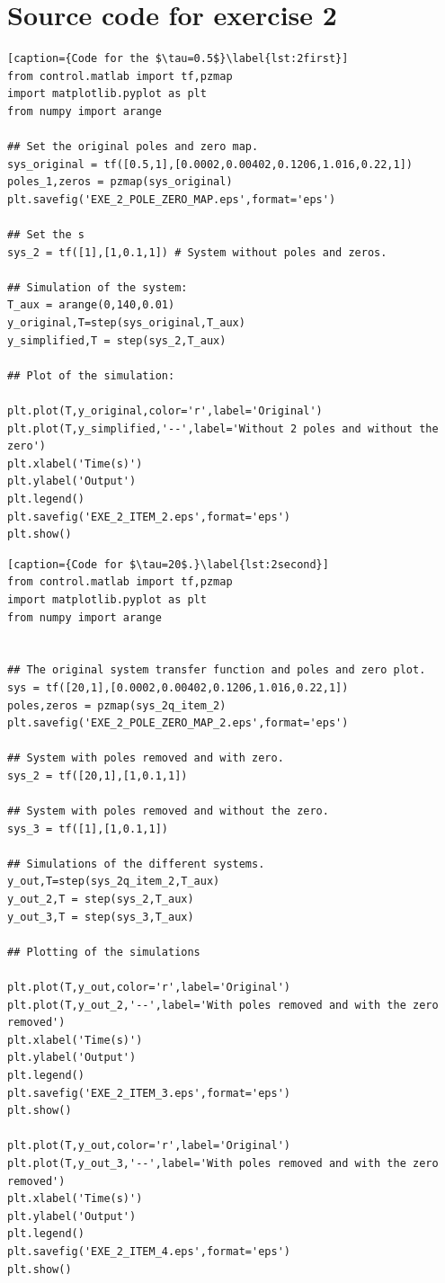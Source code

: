 \documentclass[a4paper]{article}
\begin{document}
\section{Source code for exercise 2}



\begin{lstlisting}[caption={Code for the $\tau=0.5$}\label{lst:2first}]
from control.matlab import tf,pzmap
import matplotlib.pyplot as plt
from numpy import arange

## Set the original poles and zero map.
sys_original = tf([0.5,1],[0.0002,0.00402,0.1206,1.016,0.22,1])
poles_1,zeros = pzmap(sys_original)
plt.savefig('EXE_2_POLE_ZERO_MAP.eps',format='eps')

## Set the s
sys_2 = tf([1],[1,0.1,1]) # System without poles and zeros.

## Simulation of the system:
T_aux = arange(0,140,0.01)
y_original,T=step(sys_original,T_aux)
y_simplified,T = step(sys_2,T_aux)

## Plot of the simulation:

plt.plot(T,y_original,color='r',label='Original')
plt.plot(T,y_simplified,'--',label='Without 2 poles and without the zero')
plt.xlabel('Time(s)')
plt.ylabel('Output')
plt.legend()
plt.savefig('EXE_2_ITEM_2.eps',format='eps')
plt.show()
\end{lstlisting}

\begin{lstlisting}[caption={Code for $\tau=20$.}\label{lst:2second}]
from control.matlab import tf,pzmap
import matplotlib.pyplot as plt
from numpy import arange


## The original system transfer function and poles and zero plot.
sys = tf([20,1],[0.0002,0.00402,0.1206,1.016,0.22,1])
poles,zeros = pzmap(sys_2q_item_2)
plt.savefig('EXE_2_POLE_ZERO_MAP_2.eps',format='eps')

## System with poles removed and with zero.
sys_2 = tf([20,1],[1,0.1,1])

## System with poles removed and without the zero.
sys_3 = tf([1],[1,0.1,1])

## Simulations of the different systems.
y_out,T=step(sys_2q_item_2,T_aux)
y_out_2,T = step(sys_2,T_aux)
y_out_3,T = step(sys_3,T_aux)

## Plotting of the simulations

plt.plot(T,y_out,color='r',label='Original')
plt.plot(T,y_out_2,'--',label='With poles removed and with the zero removed')
plt.xlabel('Time(s)')
plt.ylabel('Output')
plt.legend()
plt.savefig('EXE_2_ITEM_3.eps',format='eps')
plt.show()

plt.plot(T,y_out,color='r',label='Original')
plt.plot(T,y_out_3,'--',label='With poles removed and with the zero removed')
plt.xlabel('Time(s)')
plt.ylabel('Output')
plt.legend()
plt.savefig('EXE_2_ITEM_4.eps',format='eps')
plt.show()
\end{lstlisting}
\end{document}
